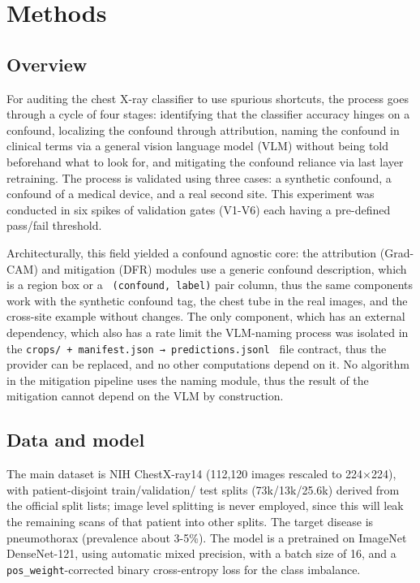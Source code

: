 \documentclass{ieeeaccess}
\begin{document}
\section{Methods}
\label{sec:methods}

\subsection{Overview}
For auditing the chest X-ray classifier to use spurious shortcuts,
the process goes through a cycle of four stages: identifying that the
classifier accuracy hinges on a confound, localizing the confound through
attribution, naming the confound in clinical terms via a general vision
language model (VLM) without being told beforehand what to look for, and
mitigating the confound reliance via last layer retraining. The process is
validated using three cases: a synthetic confound, a confound of a medical
device, and a real second site. This experiment was conducted in six spikes
of validation gates (V1-V6) each having a pre-defined pass/fail threshold.

Architecturally, this field yielded a confound agnostic core: the attribution (Grad-CAM) and mitigation (DFR) modules use a generic confound description, which is a region box or a \texttt{ (confound, label)} pair column, thus the same components work with the synthetic confound tag, the chest tube in the real images, and the cross-site example without changes. The only component, which has an external dependency, which also has a rate limit  the VLM-naming process  was isolated in the \texttt {crops/ + manifest.json
→ predictions.jsonl } file contract, thus the provider can be replaced, and no other computations depend on it. No algorithm in the mitigation pipeline uses the naming module, thus the result of the mitigation cannot depend on the VLM by construction.

\subsection{Data and model}
The main dataset is NIH ChestX-ray14 (112,120 images rescaled to 224$\times$224),
with patient-disjoint train/validation/
test splits (73k/13k/25.6k) derived from the
official split lists; image level splitting is never employed, since this will leak
the remaining scans of that patient into other splits. The target disease is
pneumothorax (prevalence about 3-5\%). The model is a pretrained on ImageNet
DenseNet-121, using automatic mixed precision, with a batch size of 16, and
a \texttt{pos\_weight}-corrected
binary cross-entropy loss for the class imbalance.
\end{document}

